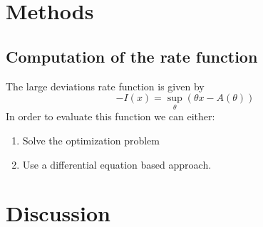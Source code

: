 \documentclass[10pt, twocolumn]{article}      %
\begin{document}
\section{Methods}
\subsection{Computation of the rate function}
The large deviations rate function is given by
\begin{equation}
  -I(x) = \sup_{\theta}( \theta x - A(\theta) )
\end{equation}
In order to evaluate this function we can either:
\begin{enumerate}
  \item Solve the optimization problem
  \item Use a differential equation based approach.
\end{enumerate}




\section{Discussion}




\end{document}
